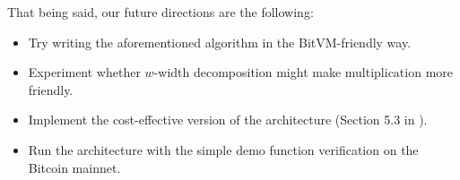 \documentclass{iacrtrans}
\begin{document}
That being said, our future directions are the following:
\begin{itemize}
  \item Try writing the aforementioned algorithm in the BitVM-friendly way.
  \item Experiment whether $w$-width decomposition might make multiplication
  more friendly.
  \item Implement the cost-effective version of the architecture (Section 5.3 in
  \cite{bitvm2}).
  \item Run the architecture with the simple demo function verification on the
  Bitcoin mainnet.
\end{itemize}

\printbibliography{}
\end{document}
